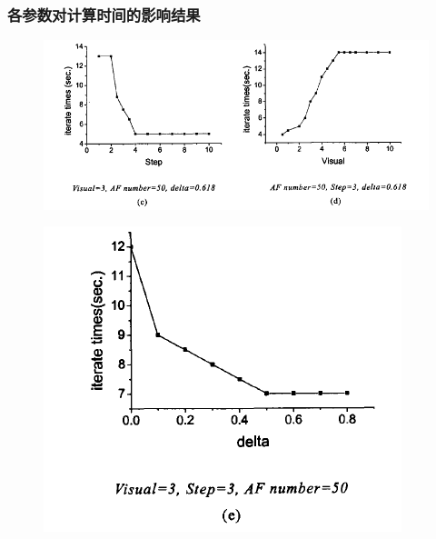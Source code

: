 \begin{frame}
\frametitle{各参数对计算时间的影响结果}
\begin{figure}
\centering
\includegraphics[height=0.5\textheight]{pic/fish7.png}
\end{figure}
\begin{figure}
\centering
\includegraphics[height=0.5\textheight]{pic/fish8.png}
\end{figure}
\end{frame}


